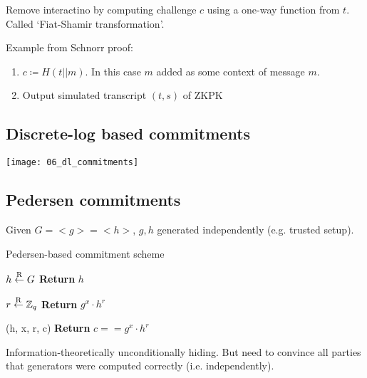 Remove interactino by computing challenge $c$ using a one-way function from
$t$. Called `Fiat-Shamir transformation'.

Example from Schnorr proof:
\begin{enumerate}
		\item $c \coloneqq H(t || m)$. In this case $m$ added as some context
				of message $m$.
		\item Output simulated transcript $(t, s)$ of ZKPK
\end{enumerate}

\subsection{Discrete-log based commitments}

\texttt{[image: 06\_dl\_commitments]}

\subsection{Pedersen commitments}

Given $G = <g> = <h>$, $g, h$ generated independently (e.g. trusted setup).


\begin{algorithm}
		\caption{Pedersen-based commitment scheme}

		\begin{algorithmic}[0]
						\State $h \overset{\mathrm{R}}{\gets} G$
						\State \textbf{Return} $h$
				\EndProcedure

						\State $r \overset{\mathrm{R}}{\gets} \mathbb{Z}_q$
						\State \textbf{Return} $g^x \cdot h^r$
				\EndProcedure

				(h, x, r, c)
						\State \textbf{Return} $c == g^x \cdot h^r$
				\EndProcedure
		\end{algorithmic}
\end{algorithm}

Information-theoretically unconditionally hiding. But need to convince all
parties that generators were computed correctly (i.e. independently).
